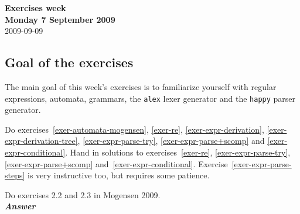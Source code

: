 \documentclass[a4paper]{article}
\begin{document}
\begin{center}
{\Large\bf Exercises week \\[1ex]
Monday 7 September 2009}\\[1ex]
{\small 2009-09-09}\\[2ex]
\end{center}

\subsection*{Goal of the exercises}

The main goal of this week's exercises is to familiarize yourself with
regular expressions, automata, grammars, the \texttt{alex} lexer
generator and the \texttt{happy} parser generator.

\noindent 
Do exercises~\ref{exer-automata-mogensen}, \ref{exer-re},
\ref{exer-expr-derivation}, \ref{exer-expr-derivation-tree},
\ref{exer-expr-parse-try}, \ref{exer-expr-parse+scomp} and
\ref{exer-expr-conditional}.  Hand in solutions to
exercises~\ref{exer-re}, \ref{exer-expr-parse-try},
\ref{exer-expr-parse+scomp} and~\ref{exer-expr-conditional}.
Exercise~\ref{exer-expr-parse-steps} is very instructive too, but
requires some patience.


\begin{exercise}\label{exer-automata-mogensen}

Do exercises 2.2 and 2.3 in Mogensen 2009.\\

\noindent
\textbf{\emph{Answer}} \\
{\color{red}{I haven't translated this question/answer - not sure about its relevance?}}
\end{exercise}
\end{document}
